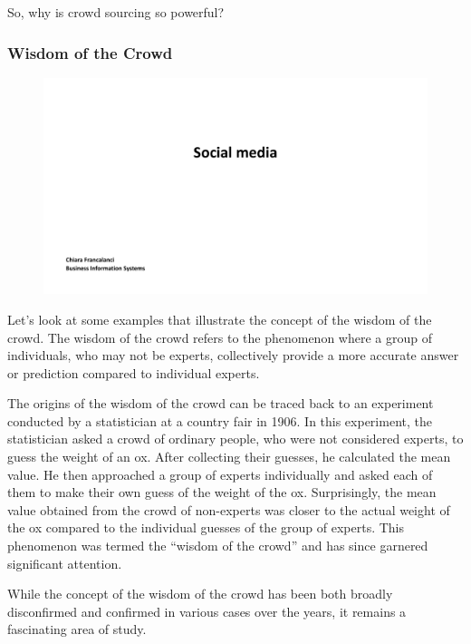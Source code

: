 So, why is crowd sourcing so powerful?

\subsubsection{Wisdom of the Crowd}\label{wisdom-of-the-crowd}

\begin{figure}[!h]
  \centering
  \includegraphics[page=7, trim = 1.5cm 4cm 2cm 4.5cm, clip, width=\imagewidth]{images/04 - Social_Media.pdf}
\end{figure}

Let's look at some examples that illustrate the concept of the wisdom of
the crowd. The wisdom of the crowd refers to the phenomenon where a
group of individuals, who may not be experts, collectively provide a
more accurate answer or prediction compared to individual experts.

The origins of the wisdom of the crowd can be traced back to an
experiment conducted by a statistician at a country fair in 1906. In
this experiment, the statistician asked a crowd of ordinary people, who
were not considered experts, to guess the weight of an ox. After
collecting their guesses, he calculated the mean value. He then
approached a group of experts individually and asked each of them to
make their own guess of the weight of the ox. Surprisingly, the mean
value obtained from the crowd of non-experts was closer to the actual
weight of the ox compared to the individual guesses of the group of
experts. This phenomenon was termed the ``wisdom of the crowd'' and has
since garnered significant attention.

While the concept of the wisdom of the crowd has been both broadly
disconfirmed and confirmed in various cases over the years, it remains a
fascinating area of study.

